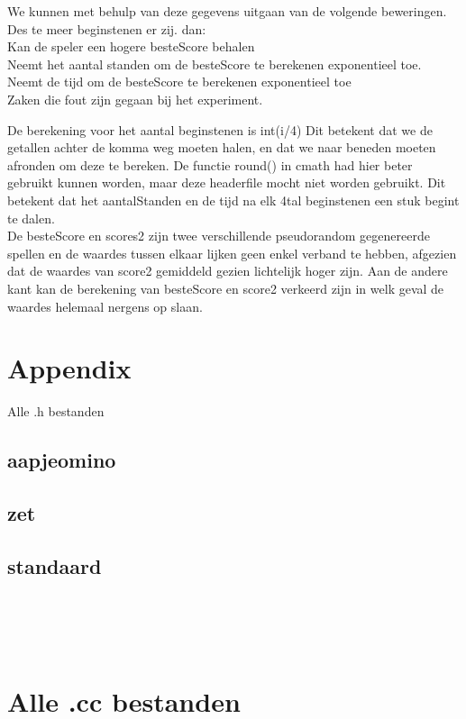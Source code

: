 \documentclass{article}
\begin{document}
We kunnen met behulp van deze gegevens uitgaan van de volgende beweringen. Des te meer beginstenen er zij. dan:\\
Kan de speler een hogere besteScore behalen\\
Neemt het aantal standen om de besteScore te berekenen exponentieel toe.\\
Neemt de tijd om de besteScore te berekenen exponentieel toe\\ 

Zaken die fout zijn gegaan bij het experiment.

De berekening voor het aantal beginstenen is int(i/4) Dit betekent dat we de getallen achter de komma weg moeten halen, en dat we naar beneden moeten afronden om deze te bereken. De functie round() in cmath had hier beter gebruikt kunnen worden, maar deze headerfile mocht niet worden gebruikt. Dit betekent dat het aantalStanden en de tijd na elk 4tal beginstenen een stuk begint te dalen.\\

De besteScore en scores2 zijn twee verschillende pseudorandom gegenereerde spellen en de waardes tussen elkaar lijken geen enkel verband te hebben, afgezien dat de waardes van score2 gemiddeld gezien lichtelijk hoger zijn. Aan de andere kant kan de berekening van besteScore en score2 verkeerd zijn in welk geval de waardes helemaal nergens op slaan. \\

\section{Appendix}
Alle .h bestanden\\
\subsection{aapjeomino}

\subsection{zet}

\subsection{standaard}
\\
\\
\\
\section{Alle .cc bestanden}
\end{document}

